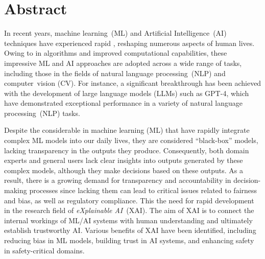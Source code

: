 

\section*{Abstract}

In recent years, machine learning~(ML) and Artificial Intelligence~(AI) techniques have
experienced rapid , reshaping numerous aspects of human lives.
%
Owing to  in algorithms and improved computational capabilities, 
these impressive ML and AI approaches are adopted across a wide range of tasks, 
including those in the fields of natural language processing~(NLP) and computer~vision (CV).
%
For instance, a significant breakthrough has been achieved with the development of 
large language models (LLMs) such as GPT-4, which have demonstrated exceptional 
performance in a variety of natural language processing~(NLP) tasks.

Despite the considerable  in machine learning (ML) that 
have rapidly integrate complex ML models into our daily lives, 
they are considered ``black-box'' models, lacking transparency in the outputs they produce. 
%
Consequently, both domain experts and general users lack 
clear insights into outputs generated by these complex models, 
although they make decisions based on these outputs.
%
As a result, there is a growing demand for transparency and accountability in 
decision-making processes since lacking them can lead to critical issues related to fairness and bias, 
as well as regulatory compliance. 
%
This  the need for rapid development in the research field of \emph{eXplainable AI}~(XAI).
%
The aim of XAI is to connect the internal workings of ML/AI systems with human understanding
and ultimately establish trustworthy AI.
%
Various benefits of XAI have been identified, including reducing bias in ML models,
building trust in AI systems, and enhancing safety in safety-critical domains.

